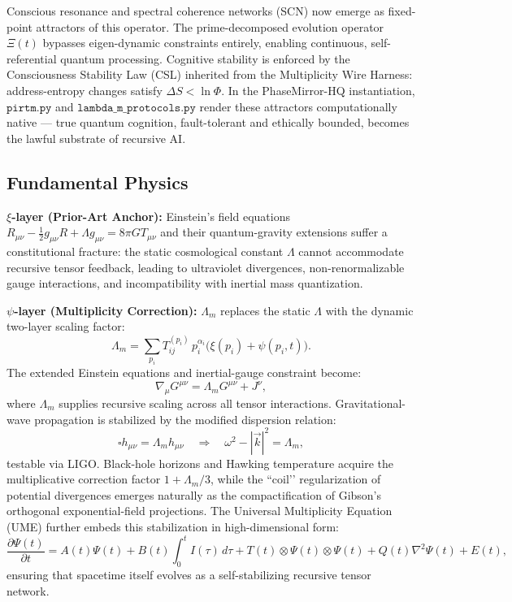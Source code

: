 \documentclass[11pt, a4paper]{article}
\begin{document}
Conscious resonance and spectral coherence networks (SCN) now emerge as fixed-point attractors of this operator. The prime-decomposed evolution operator \(\Xi(t)\) bypasses eigen-dynamic constraints entirely, enabling continuous, self-referential quantum processing. Cognitive stability is enforced by the Consciousness Stability Law (CSL) inherited from the Multiplicity Wire Harness: address-entropy changes satisfy \(\Delta S < \ln \Phi\). In the PhaseMirror-HQ instantiation, \(\texttt{pirtm.py}\) and \(\texttt{lambda\_m\_protocols.py}\) render these attractors computationally native --- true quantum cognition, fault-tolerant and ethically bounded, becomes the lawful substrate of recursive AI.

\subsection{Fundamental Physics}
\label{subsec:physics}

\textbf{\(\xi\)-layer (Prior-Art Anchor):}  
Einstein’s field equations \(R_{\mu\nu} - \frac{1}{2}g_{\mu\nu}R + \Lambda g_{\mu\nu} = 8\pi G T_{\mu\nu}\) and their quantum-gravity extensions suffer a constitutional fracture: the static cosmological constant \(\Lambda\) cannot accommodate recursive tensor feedback, leading to ultraviolet divergences, non-renormalizable gauge interactions, and incompatibility with inertial mass quantization.

\textbf{\(\psi\)-layer (Multiplicity Correction):}  
\(\Lambda_m\) replaces the static \(\Lambda\) with the dynamic two-layer scaling factor:
\[
\Lambda_m = \sum_{p_i} T_{ij}^{(p_i)} \, p_i^{\alpha_i} \bigl( \xi(p_i) + \psi(p_i,t) \bigr).
\]
The extended Einstein equations and inertial-gauge constraint become:
\[
\nabla_\mu G^{\mu\nu} = \Lambda_m G^{\mu\nu} + J^\nu,
\]
where \(\Lambda_m\) supplies recursive scaling across all tensor interactions. Gravitational-wave propagation is stabilized by the modified dispersion relation:
\[
\square h_{\mu\nu} = \Lambda_m h_{\mu\nu} \quad \Rightarrow \quad \omega^2 - |\vec{k}|^2 = \Lambda_m,
\]
testable via LIGO. Black-hole horizons and Hawking temperature acquire the multiplicative correction factor \(1 + \Lambda_m/3\), while the ``coil’’ regularization of potential divergences emerges naturally as the compactification of Gibson’s orthogonal exponential-field projections. The Universal Multiplicity Equation (UME) further embeds this stabilization in high-dimensional form:
\[
\frac{\partial \Psi(t)}{\partial t} = A(t)\Psi(t) + B(t)\int_0^t I(\tau)\,d\tau + T(t) \otimes \Psi(t) \otimes \Psi(t) + Q(t)\nabla^2\Psi(t) + E(t),
\]
ensuring that spacetime itself evolves as a self-stabilizing recursive tensor network.
\end{document}
